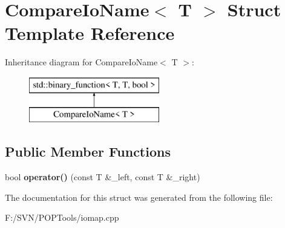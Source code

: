 \hypertarget{struct_compare_io_name}{\section{Compare\-Io\-Name$<$ T $>$ Struct Template Reference}
\label{struct_compare_io_name}
}
Inheritance diagram for Compare\-Io\-Name$<$ T $>$\-:\begin{figure}[H]
\begin{center}
\leavevmode
\includegraphics[height=2.000000cm]{struct_compare_io_name}
\end{center}
\end{figure}
\subsection*{Public Member Functions}
\begin{DoxyCompactItemize}
\item 
\hypertarget{struct_compare_io_name_ab9399673199623dac93109b3d8b68bd4}{bool {\bfseries operator()} (const T \&\-\_\-left, const T \&\-\_\-right)}\label{struct_compare_io_name_ab9399673199623dac93109b3d8b68bd4}

\end{DoxyCompactItemize}


The documentation for this struct was generated from the following file\-:\begin{DoxyCompactItemize}
\item 
F\-:/\-S\-V\-N/\-P\-O\-P\-Tools/iomap.\-cpp\end{DoxyCompactItemize}
